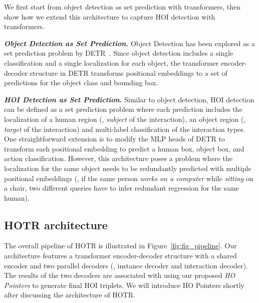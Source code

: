 \documentclass[final]{cvpr}
\begin{document}
We first start from object detection as set prediction with transformers, then show how we extend this architecture to capture HOI detection with transformers.
\newline

\noindent\textit{\textbf{Object Detection as Set Prediction.}}
Object Detection has been explored as a set prediction problem by DETR~\cite{carion2020end}.
Since object detection includes a single classification and a single localization for each object, the transformer encoder-decoder structure in DETR transforms  positional embeddings to a set of  predictions for the object class and bounding box.
\newline

\noindent\textit{\textbf{HOI Detection as Set Prediction.}}
Similar to object detection, HOI detection can be defined as a set prediction problem where each prediction includes the localization of a human region (\ie, \textit{subject} of the interaction), an object region (\ie, \textit{target} of the interaction) and multi-label classification of the interaction types.
One straightforward extension is to modify the MLP heads of DETR to transform each positional embedding to predict a human box, object box, and action classification.
However, this architecture poses a problem where the localization for the same object needs to be redundantly predicted with multiple positional embeddings (\eg, if the same person \textit{works on a computer} while \textit{sitting} on a chair, two different queries have to infer redundant regression for the same human).
\newline


































 \subsection{HOTR architecture}
The overall pipeline of HOTR is illustrated in Figure~\ref{fig:fig_pipeline}.
Our architecture features a transformer encoder-decoder structure with a shared encoder and two parallel decoders (\ie, instance decoder and interaction decoder).
The results of the two decoders are associated with using our proposed \textit{HO Pointers} to generate final HOI triplets.
We will introduce HO Pointers shortly after discussing the architecture of HOTR.
\newline
\end{document}
